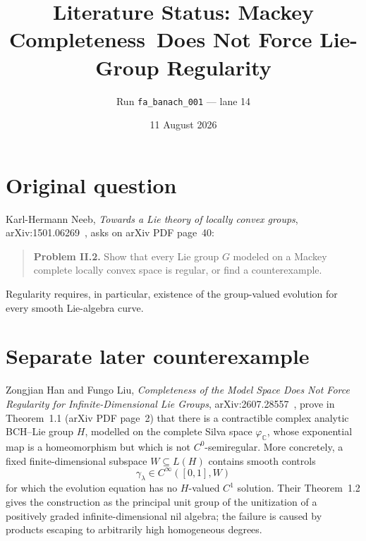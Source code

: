\documentclass[11pt]{article}
\title{Literature Status: Mackey Completeness\
Does Not Force Lie-Group Regularity}
\author{Run \texttt{fa\_banach\_001} --- lane 14}
\date{11 August 2026}
\begin{document}
\maketitle

\begin{center}
\end{center}

\section{Original question}

Karl-Hermann Neeb, \emph{Towards a Lie theory of locally convex groups},
arXiv:1501.06269~\cite{source}, asks on arXiv PDF page~40:
\begin{quote}
\textbf{Problem II.2.} Show that every Lie group $G$ modeled on a Mackey
complete locally convex space is regular, or find a counterexample.
\end{quote}
Regularity requires, in particular, existence of the group-valued evolution
for every smooth Lie-algebra curve.

\section{Separate later counterexample}

Zongjian Han and Fungo Liu, \emph{Completeness of the Model Space Does Not
Force Regularity for Infinite-Dimensional Lie Groups},
arXiv:2607.28557~\cite{answerpaper}, prove in Theorem~1.1 (arXiv PDF page~2)
that there is a contractible complex analytic BCH--Lie group $H$, modelled on
the complete Silva space $\varphi_{\mathbb C}$, whose exponential map is a
homeomorphism but which is not $C^0$-semiregular.  More concretely, a fixed
finite-dimensional subspace $W\subseteq L(H)$ contains smooth controls
\[
  \gamma_\lambda\in C^\infty([0,1],W)
\]
for which the evolution equation has no $H$-valued $C^1$ solution.  Their
Theorem~1.2 gives the construction as the principal unit group of the
unitization of a positively graded infinite-dimensional nil algebra; the
failure is caused by products escaping to arbitrarily high homogeneous
degrees.
\end{document}
